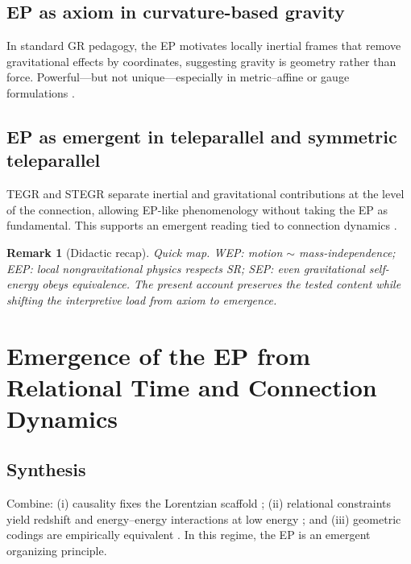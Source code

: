 \documentclass[11pt,a4paper]{article}
\theoremstyle{thmstyleone}
\theoremstyle{thmstyletwo}
\newtheorem{remark}{Remark}
\theoremstyle{thmstylethree}
\begin{document}
    \subsection{EP as axiom in curvature-based gravity}\label{subsec:axiom}
        In standard GR pedagogy, the EP motivates locally inertial frames that remove gravitational effects by coordinates, suggesting gravity is geometry rather than force. Powerful—but not unique—especially in metric--affine or gauge formulations \cite{ManciniTinoCapozziello2025}.

    \subsection{EP as emergent in teleparallel and symmetric teleparallel}\label{subsec:teleparallel}
        TEGR and STEGR separate inertial and gravitational contributions at the level of the connection, allowing EP-like phenomenology without taking the EP as fundamental. This supports an emergent reading tied to connection dynamics \cite{ManciniTinoCapozziello2025,BeltranJimenez2018,AldrovandiPereira2013}.

        \begin{remark}[Didactic recap]
            \emph{Quick map.} WEP: motion $\sim$ mass-independence; EEP: local nongravitational physics respects SR; SEP: even gravitational self-energy obeys equivalence. The present account preserves the tested content while shifting the interpretive load from axiom to emergence.
        \end{remark}

    \section{Emergence of the EP from Relational Time and Connection Dynamics}\label{sec:emergence}

    \subsection{Synthesis}\label{subsec:synthesis}
        Combine: (i) causality fixes the Lorentzian scaffold \cite{Pineda2026,Zeeman1964}; (ii) relational constraints yield redshift and energy--energy interactions at low energy \cite{SinghFriedrich2025,PageWootters1983}; and (iii) geometric codings are empirically equivalent \cite{ManciniTinoCapozziello2025,BeltranJimenez2018}. In this regime, the EP is an emergent organizing principle.
\end{document}
